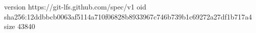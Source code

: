 version https://git-lfs.github.com/spec/v1
oid sha256:12ddbbcb0063af5114a710f06828b8933967c746b739b1c69272a27df1b717a4
size 43840
